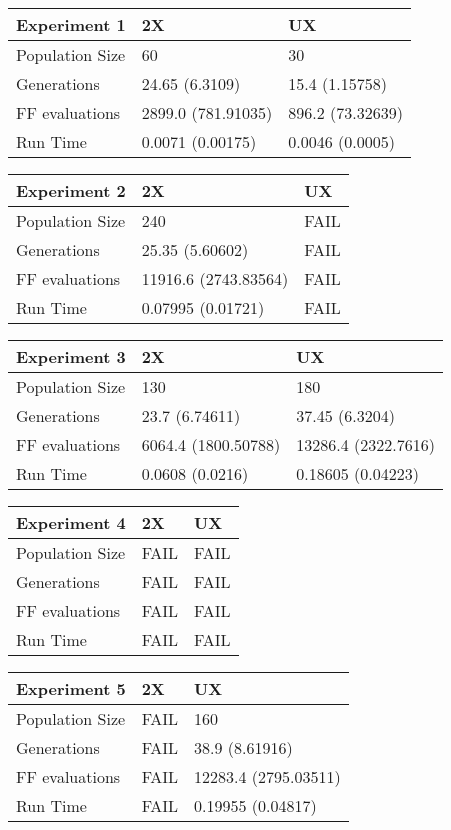\documentclass{article}%
\begin{document}
%
\normalsize%
\begin{tabular}{l l l}%
Experiment 1&2X&UX\\%
\hline%
Population Size&60&30\\%
Generations&24.65 (6.3109)&15.4 (1.15758)\\%
FF evaluations&2899.0 (781.91035)&896.2 (73.32639)\\%
Run Time&0.0071 (0.00175)&0.0046 (0.0005)\\%
\end{tabular}%
\newline%
\begin{tabular}{l l l}%
Experiment 2&2X&UX\\%
\hline%
Population Size&240&FAIL\\%
Generations&25.35 (5.60602)&FAIL\\%
FF evaluations&11916.6 (2743.83564)&FAIL\\%
Run Time&0.07995 (0.01721)&FAIL\\%
\end{tabular}%
\newline%
\begin{tabular}{l l l}%
Experiment 3&2X&UX\\%
\hline%
Population Size&130&180\\%
Generations&23.7 (6.74611)&37.45 (6.3204)\\%
FF evaluations&6064.4 (1800.50788)&13286.4 (2322.7616)\\%
Run Time&0.0608 (0.0216)&0.18605 (0.04223)\\%
\end{tabular}%
\newline%
\begin{tabular}{l l l}%
Experiment 4&2X&UX\\%
\hline%
Population Size&FAIL&FAIL\\%
Generations&FAIL&FAIL\\%
FF evaluations&FAIL&FAIL\\%
Run Time&FAIL&FAIL\\%
\end{tabular}%
\newline%
\begin{tabular}{l l l}%
Experiment 5&2X&UX\\%
\hline%
Population Size&FAIL&160\\%
Generations&FAIL&38.9 (8.61916)\\%
FF evaluations&FAIL&12283.4 (2795.03511)\\%
Run Time&FAIL&0.19955 (0.04817)\\%
\end{tabular}%
\newline%
\end{document}
